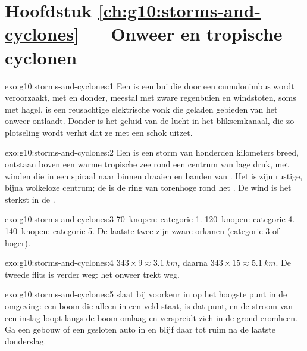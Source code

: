 \section*{Hoofdstuk \ref{ch:g10:storms-and-cyclones} --- Onweer en tropische cyclonen}

\begin{solution}{exo:g10:storms-and-cyclones:1}
Een  is een bui die door een cumulonimbus wordt veroorzaakt, met
 en donder, meestal met zware regenbuien en windstoten, soms met hagel.
 is een reusachtige elektrische vonk die geladen gebieden van het onweer
ontlaadt. Donder is het geluid van de lucht in het bliksemkanaal, die zo
plotseling wordt verhit dat ze met een schok uitzet.
\end{solution}

\begin{solution}{exo:g10:storms-and-cyclones:2}
Een  is een storm van honderden kilometers breed, ontstaan
boven een warme tropische zee rond een centrum van lage druk, met winden die in
een spiraal naar binnen draaien en banden van . Het  is zijn
rustige, bijna wolkeloze centrum; de  is de ring van torenhoge
 rond het . De wind is het sterkst in de .
\end{solution}

\begin{solution}{exo:g10:storms-and-cyclones:3}
\num{70}~knopen: categorie 1. \num{120}~knopen: categorie 4.
\num{140}~knopen: categorie 5. De laatste twee zijn zware orkanen (categorie 3
of hoger).
\end{solution}

\begin{solution}{exo:g10:storms-and-cyclones:4}
$343 \times 9 \approx \qty{3.1}{km}$, daarna $343 \times 15 \approx
\qty{5.1}{km}$. De tweede flits is verder weg: het onweer trekt weg.
\end{solution}

\begin{solution}{exo:g10:storms-and-cyclones:5}
 slaat bij voorkeur in op het hoogste punt in de omgeving: een boom die
alleen in een veld staat, is dat punt, en de stroom van een inslag loopt langs
de boom omlaag en verspreidt zich in de grond eromheen. Ga een gebouw of een
gesloten auto in en blijf daar tot ruim na de laatste donderslag.
\end{solution}

